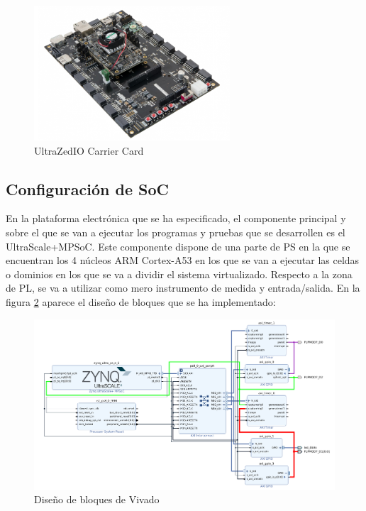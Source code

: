 \begin{figure}[h]
	\centering
	\includegraphics[width=0.65\textwidth]{recursos/ultrazed-eg-carrier.png}
	\caption{UltraZed\texttrademark IO Carrier Card}
	\label{fig:ultrazed-eg-carrier}
\end{figure}

\subsection{Configuración de SoC} \label{vivado_config}

En la plataforma electrónica que se ha especificado, el componente principal y sobre el que se van a ejecutar los programas y pruebas que se desarrollen es el UltraScale+\texttrademark MPSoC. Este componente dispone de una parte de \acrshort{PS} en la que se encuentran los 4 núcleos ARM Cortex-A53 en los que se van a ejecutar las celdas o dominios en los que se va a dividir el sistema virtualizado. Respecto a la zona de \acrshort{PL}, se va a utilizar como mero instrumento de medida y entrada/salida. En la figura \ref{fig:vivado_1} aparece el diseño de bloques que se ha implementado:

\begin{figure}[h!]
	\centering
	\includegraphics[angle=90,width=\textwidth,height=\textheight,keepaspectratio]{recursos/vivado_1.png}
	\caption{Diseño de bloques de Vivado}
	\label{fig:vivado_1}
\end{figure}

